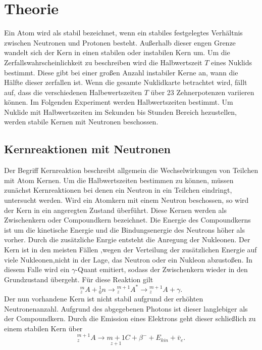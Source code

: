 \section{Theorie}
\label{sec:theorie}

Ein Atom wird als stabil bezeichnet, wenn ein stabiles festgelegtes Verhältnis zwischen Neutronen und Protonen besteht.
Außerhalb dieser engen Grenze wandelt sich der Kern in einen stabilen oder instabilen Kern um.
Um die Zerfallswahrscheinlichkeit zu beschreiben wird die Halbwertszeit $T$ eines Nuklids bestimmt. Diese gibt bei einer 
großen Anzahl instabiler Kerne an, wann die Hälfte dieser zerfallen ist. Wenn die gesamte Nuklidkarte betrachtet wird, fällt auf, dass 
die verschiedenen Halbewertszeiten $T$ über 23 Zehnerpotenzen variieren können.
Im Folgenden Experiment werden Halbwertszeiten bestimmt. Um Nuklide mit Halbwertszeiten im Sekunden bis Stunden Bereich hezustellen,
werden stabile Kernen mit Neutronen beschossen.

\subsection{Kernreaktionen mit Neutronen}
\label{sec:Kernreaktionen mit Neutronen}

Der Begriff Kernreaktion beschreibt allgemein die Wechselwirkungen von Teilchen mit Atom Kernen.
Um die Halbwertszeiten bestimmen zu können, müssen zunächst Kernreaktionen bei denen ein Neutron in ein Teilchen
eindringt, untersucht werden. Wird ein Atomkern mit einem Neutron beschossen, so wird der Kern in ein angeregten Zustand überführt.
Diese Kernen werden als Zwischenkern oder Compoundkern bezeichnet.
Die Energie des Compoundkerns ist um die kinetische Energie und die Bindungsenergie des Neutrons höher als
vorher. Durch die zusätzliche Enrgie entsteht die Anregung der Nukleonen. Der Kern ist in den meisten Fällen ,wegen der
Verteilung der zusätzlichen Energie auf viele Nukleonen,nicht in der Lage, das Neutron oder ein Nukleon abzustoßen.
In diesem Falle wird ein $\gamma$-Quant emitiert, sodass der Zwischenkern wieder in den Grundzustand übergeht.
Für diese Reaktion gilt
\begin{equation}
    { }_z^m A+{ }_0^1 n \rightarrow{ }_z^{m+1} A^* \rightarrow{ }_z^{m+1} A+\gamma .
    \label{eqn:vorher}
\end{equation}
Der nun vorhandene Kern ist nicht stabil aufgrund der erhöhten Neutronenanzahl. Aufgrund des abgegebenen
Photons ist dieser langlebiger als der Compoundkern. Durch die Emission eines Elektrons geht dieser schließlich zu einem 
stabilen Kern über
\begin{equation}
    { }_z^{m+1} A \rightarrow \underset{z+1}{m+1} C+\beta^{-}+E_{k i n}+\bar{v}_e .
    \label{eqn:stabil}
\end{equation}

